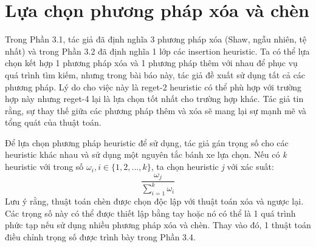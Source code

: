 \section{Lựa chọn phương pháp xóa và chèn}
Trong Phần 3.1, tác giả đã định nghĩa 3 phương pháp xóa (Shaw, ngẫu nhiên, tệ nhất) và trong Phần 3.2 đã định nghĩa 1 lớp các insertion heuristic. Ta có thể lựa chọn kết hợp 1 phương pháp xóa và 1 phương pháp thêm với nhau để phục vụ quá trình tìm kiếm, nhưng trong bài báo này, tác giả đề xuất sử dụng tất cả các phương pháp. Lý do cho việc này là reget-2 heuristic có thể phù hợp với trường hợp này nhưng reget-4 lại là lựa chọn tốt nhất cho trường hợp khác. Tác giả tin rằng, sự thay thế giữa các phương pháp thêm và xóa sẽ mang lại sự mạnh mẽ và tổng quát của thuật toán.

Để lựa chọn phương pháp heuristic để sử dụng, tác giả gán trọng số cho các heuristic khác nhau và sử dụng một nguyên tắc bánh xe lựa chọn. Nếu có \textit{k} heuristic với trong số $\omega_i, i \in \{1,2,...,k\}$, ta chọn heuristic \textit{j} với xác suất:
\begin{equation}
  \frac{\omega_j}{\sum_{i=1}^k \omega_i}
  \label{eq:20}
\end{equation}
Lưu ý rằng, thuật toán chèn được chọn độc lập với thuật toán xóa và ngược lại. Các trọng số này có thể được thiết lập bằng tay hoặc nó có thể là 1 quá trình phức tạp nếu sử dụng nhiều phương pháp xóa và chèn. Thay vào đó, 1 thuật toán điều chỉnh trọng số được trình bày trong Phần 3.4.
